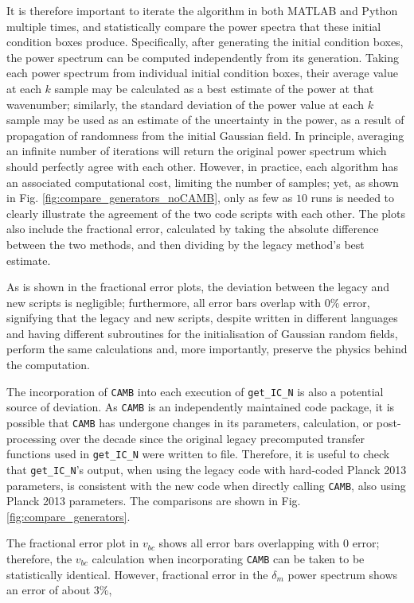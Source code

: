\documentclass[floats,floatfix,showpacs,amssymb,prd,superscriptaddress,nofootinbib]{revtex4-2} %
\newcommand{\code}{\texttt}
\begin{document}
It is therefore important to iterate the algorithm in both MATLAB and Python multiple times, and statistically compare the power spectra that these initial condition boxes produce. Specifically, after generating the initial condition boxes, the power spectrum can be computed independently from its generation. Taking each power spectrum from individual initial condition boxes, their average value at each $k$ sample may be calculated as a best estimate of the power at that wavenumber; similarly, the standard deviation of the power value at each $k$ sample may be used as an estimate of the uncertainty in the power, as a result of propagation of randomness from the initial Gaussian field. In principle, averaging an infinite number of iterations will return the original power spectrum which should perfectly agree with each other. However, in practice, each algorithm has an associated computational cost, limiting the number of samples; yet, as shown in Fig. \ref{fig:compare_generators_noCAMB}, only as few as $10$ runs is needed to clearly illustrate the agreement of the two code scripts with each other. The plots also include the fractional error, calculated by taking the absolute difference between the two methods, and then dividing by the legacy method's best estimate.

As is shown in the fractional error plots, the deviation between the legacy and new scripts is negligible; furthermore, all error bars overlap with $0 \%$ error, signifying that the legacy and new scripts, despite written in different languages and having different subroutines for the initialisation of Gaussian random fields, perform the same calculations and, more importantly, preserve the physics behind the computation.

The incorporation of \code{CAMB} into each execution of \code{get\_IC\_N} is also a potential source of deviation. As \code{CAMB} is an independently maintained code package, it is possible that \code{CAMB} has undergone changes in its parameters, calculation, or post-processing over the decade since the original legacy precomputed transfer functions used in \code{get\_IC\_N} were written to file. Therefore, it is useful to check that \code{get\_IC\_N}'s output, when using the legacy code with hard-coded Planck 2013 parameters, is consistent with the new code when directly calling \code{CAMB}, also using Planck 2013 parameters. The comparisons are shown in Fig. \ref{fig:compare_generators}.

The fractional error plot in $v_{bc}$ shows all error bars overlapping with $0$ error; therefore, the $v_{bc}$ calculation when incorporating \code{CAMB} can be taken to be statistically identical. However, fractional error in the $\delta_m$ power spectrum shows an error of about $3 \%$, 
\end{document}
